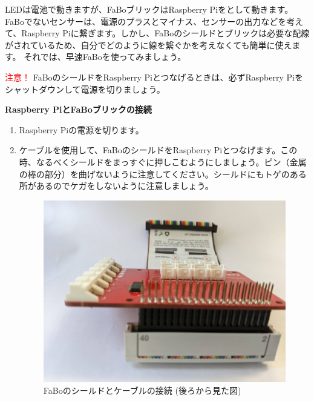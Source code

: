 LEDは電池で動きますが、FaBoブリックはRaspberry Piをとして動きます。FaBoでないセンサーは、電源のプラスとマイナス、センサーの出力などを考えて、Raspberry Piに繋ぎます。しかし、FaBoのシールドとブリックは必要な配線がされているため、自分でどのように線を繋ぐかを考えなくても簡単に使えます。
それでは、早速FaBoを使ってみましょう。

\begin{itembox}[c]{\Large\textcolor{red}{注意！}}
  FaBoのシールドをRaspberry Piとつなげるときは、必ずRaspberry Piをシャットダウンして電源を切りましょう。
\end{itembox}

\noindent
{\large \bf Raspberry PiとFaBoブリックの接続}
\begin{enumerate}
  \item Raspberry Piの電源を切ります。\\
  \item ケーブルを使用して、FaBoのシールドをRaspberry Piとつなげます。この時、なるべくシールドをまっすぐに押しこむようにしましょう。ピン（金属の棒の部分）を曲げないように注意してください。シールドにもトゲのある所があるのでケガをしないように注意しましょう。\\
  \begin{minipage}[b]{0.4\linewidth}
    \begin{figure}[H]
      \centering
      \includegraphics[width=.8\hsize]{images/chap05/fabo_and_cable_rearview.jpg}
      \caption{FaBoのシールドとケーブルの接続 (後ろから見た図)}
    \end{figure}
  \end{minipage}
  \begin{minipage}[b]{0.4\linewidth}
    \begin{figure}[H]
      \centering

\end{figure}
\end{minipage}
\end{enumerate}
